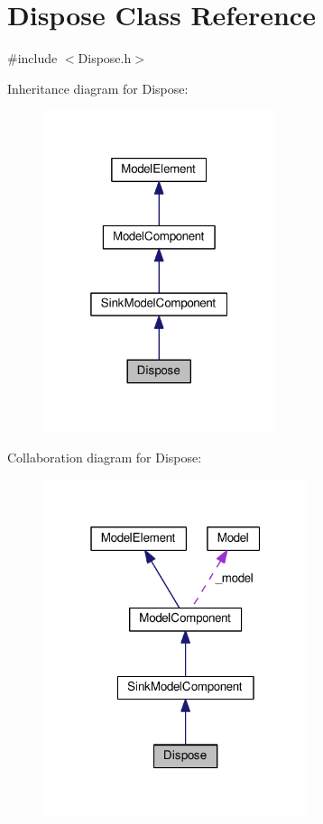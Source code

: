 \hypertarget{class_dispose}{}\section{Dispose Class Reference}
\label{class_dispose}


{\ttfamily \#include $<$Dispose.\+h$>$}



Inheritance diagram for Dispose\+:\nopagebreak
\begin{figure}[H]
\begin{center}
\leavevmode
\includegraphics[width=193pt]{class_dispose__inherit__graph}
\end{center}
\end{figure}


Collaboration diagram for Dispose\+:\nopagebreak
\begin{figure}[H]
\begin{center}
\leavevmode
\includegraphics[width=220pt]{class_dispose__coll__graph}
\end{center}
\end{figure}
